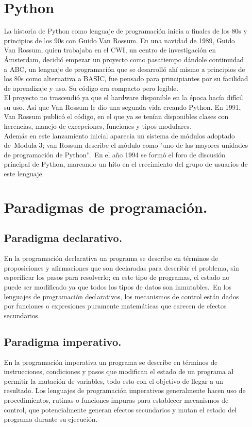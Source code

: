 \documentclass{article}
\begin{document}
\section*{Python}
La historia de Python como lenguaje de programación inicia a finales de los 80s y principios de los 90s con Guido Van Rossum. En una navidad de 1989, Guido Van Rossum, quien trabajaba en el CWI, un centro de investigación en Ámsterdam, decidió empezar un proyecto como pasatiempo dándole continuidad a ABC, un lenguaje de programación que se desarrolló ahí mismo a principios de los 80s como alternativa a BASIC, fue pensado para principiantes por su facilidad de aprendizaje y uso. Su código era compacto pero legible.\\El proyecto no trascendió ya que el hardware disponible en la época hacía difícil su uso. Así que Van Rossum le dio una segunda vida creando Python. En 1991, Van Rossum publicó el código, en el que ya se tenían disponibles clases con herencias, manejo de excepciones, funciones y tipos modulares.\\ Además en este lanzamiento inicial aparecía un sistema de módulos adoptado de Modula-3; van Rossum describe el módulo como "uno de las mayores unidades de programación de Python". En el año 1994 se formó el foro de discusión principal de Python, marcando un hito en el crecimiento del grupo de usuarios de este lenguaje.
\section*{Paradigmas de programación.}
\subsection*{Paradigma declarativo.}
En la programación declarativa un programa se describe en términos de proposiciones y afirmaciones que son declaradas para describir el problema, sin especificar los pasos para resolverlo; en este tipo de programas, el estado no puede ser modificado ya que todos los tipos de datos son inmutables. En los lenguajes de programación declarativos, los mecanismos de control están dados por funciones o expresiones puramente matemáticas que carecen de efectos secundarios.
\subsection*{Paradigma imperativo.}
En la programación imperativa un programa se describe en términos de instrucciones, condiciones y pasos que modifican el estado de un programa al permitir la mutación de variables, todo esto con el objetivo de llegar a un resultado. Los lenguajes de programación imperativos generalmente hacen uso de procedimientos, rutinas o funciones impuras para establecer mecanismos de control, que potencialmente generan efectos secundarios y mutan el estado del programa durante su ejecución.
\end{document}
